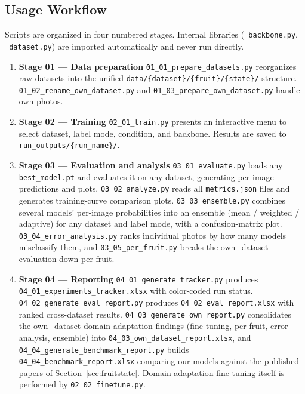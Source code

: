 \documentclass[12pt, a4paper]{article}
\begin{document}
\subsection{Usage Workflow}

Scripts are organized in four numbered stages.
Internal libraries (\texttt{\_backbone.py}, \texttt{\_dataset.py}) are
imported automatically and never run directly.

\begin{enumerate}
    \item \textbf{Stage 01 --- Data preparation}
    \texttt{01\_01\_prepare\_datasets.py} reorganizes raw datasets into the
    unified \texttt{data/\{dataset\}/\{fruit\}/\{state\}/} structure.
    \texttt{01\_02\_rename\_own\_dataset.py} and
    \texttt{01\_03\_prepare\_own\_dataset.py} handle own photos.

    \item \textbf{Stage 02 --- Training}
    \texttt{02\_01\_train.py} presents an interactive menu to select dataset,
    label mode, condition, and backbone.
    Results are saved to \texttt{run\_outputs/\{run\_name\}/}.

    \item \textbf{Stage 03 --- Evaluation and analysis}
    \texttt{03\_01\_evaluate.py} loads any \texttt{best\_model.pt} and
    evaluates it on any dataset, generating per-image predictions and plots.
    \texttt{03\_02\_analyze.py} reads all \texttt{metrics.json} files and
    generates training-curve comparison plots.
    \texttt{03\_03\_ensemble.py} combines several models' per-image
    probabilities into an ensemble (mean / weighted / adaptive) for any dataset
    and label mode, with a confusion-matrix plot.
    \texttt{03\_04\_error\_analysis.py} ranks individual photos by how many
    models misclassify them, and \texttt{03\_05\_per\_fruit.py} breaks the
    own\_dataset evaluation down per fruit.

    \item \textbf{Stage 04 --- Reporting}
    \texttt{04\_01\_generate\_tracker.py} produces
    \texttt{04\_01\_experiments\_tracker.xlsx} with color-coded run status.
    \texttt{04\_02\_generate\_eval\_report.py} produces
    \texttt{04\_02\_eval\_report.xlsx} with ranked cross-dataset results.
    \texttt{04\_03\_generate\_own\_report.py} consolidates the own\_dataset
    domain-adaptation findings (fine-tuning, per-fruit, error analysis, ensemble)
    into \texttt{04\_03\_own\_dataset\_report.xlsx}, and
    \texttt{04\_04\_generate\_benchmark\_report.py} builds
    \texttt{04\_04\_benchmark\_report.xlsx} comparing our models against the
    published papers of Section~\ref{sec:fruitstate}.
    Domain-adaptation fine-tuning itself is performed by
    \texttt{02\_02\_finetune.py}.
\end{enumerate}
\end{document}
